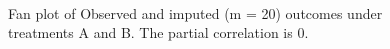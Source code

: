 \begin{figure}[ht!]
\begin{center}
{{				}
			}\\
		\end{center}
		\caption{Fan plot of Observed and imputed (m = 20) outcomes under treatments A and B. The partial correlation is 0.}
		\label{fig4_9}
	\end{figure}
	
